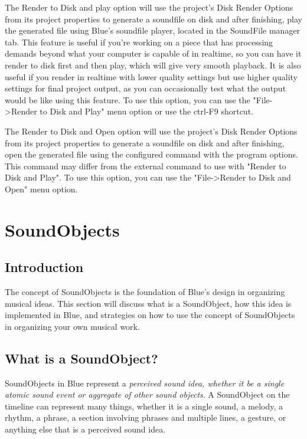 The Render to Disk and play option will use the project's Disk Render
Options from its project properties to generate a soundfile on disk and
after finishing, play the generated file using Blue's soundfile player,
located in the SoundFile manager tab. This feature is useful if you're
working on a piece that has processing demands beyond what your computer
is capable of in realtime, so you can have it render to disk first and
then play, which will give very smooth playback. It is also useful if
you render in realtime with lower quality settings but use higher
quality settings for final project output, as you can occasionally test
what the output would be like using this feature. To use this option,
you can use the "File-\textgreater{}Render to Disk and Play" menu option
or use the ctrl-F9 shortcut.

The Render to Disk and Open option will use the project's Disk Render
Options from its project properties to generate a soundfile on disk and
after finishing, open the generated file using the configured command
with the program options. This command may differ from the external
command to use with "Render to Disk and Play". To use this option, you
can use the "File-\textgreater{}Render to Disk and Open" menu option.

\section{SoundObjects}\label{conceptsSoundObjects}

\subsection{Introduction}

The concept of SoundObjects is the foundation of Blue's design in
organizing musical ideas. This section will discuss what is a
SoundObject, how this idea is implemented in Blue, and strategies on how
to use the concept of SoundObjects in organizing your own musical work.

\subsection{What is a SoundObject?}

SoundObjects in Blue represent a \emph{perceived sound idea, whether it
be a single atomic sound event or aggregate of other sound objects}. A
SoundObject on the timeline can represent many things, whether it is a
single sound, a melody, a rhythm, a phrase, a section involving phrases
and multiple lines, a gesture, or anything else that is a perceived
sound idea.

